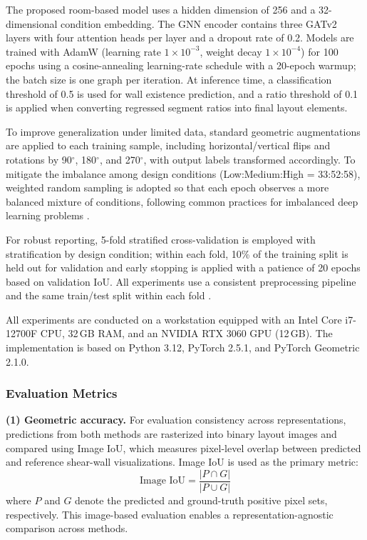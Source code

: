 The proposed room-based model uses a hidden dimension of 256 and a 32-dimensional condition embedding. The GNN encoder contains three GATv2 layers with four attention heads per layer and a dropout rate of 0.2. Models are trained with AdamW (learning rate $1\times 10^{-3}$, weight decay $1\times 10^{-4}$) for 100 epochs using a cosine-annealing learning-rate schedule with a 20-epoch warmup; the batch size is one graph per iteration. At inference time, a classification threshold of 0.5 is used for wall existence prediction, and a ratio threshold of 0.1 is applied when converting regressed segment ratios into final layout elements.

To improve generalization under limited data, standard geometric augmentations are applied to each training sample, including horizontal/vertical flips and rotations by 90$^{\circ}$, 180$^{\circ}$, and 270$^{\circ}$, with output labels transformed accordingly. To mitigate the imbalance among design conditions (Low:Medium:High = 33:52:58), weighted random sampling is adopted so that each epoch observes a more balanced mixture of conditions, following common practices for imbalanced deep learning problems \cite{johnsonSurveyDeepLearning2019}.

For robust reporting, 5-fold stratified cross-validation is employed with stratification by design condition; within each fold, 10\% of the training split is held out for validation and early stopping is applied with a patience of 20 epochs based on validation IoU. All experiments use a consistent preprocessing pipeline and the same train/test split within each fold \cite{Berrar_2019}.

All experiments are conducted on a workstation equipped with an Intel Core i7-12700F CPU, 32\,GB RAM, and an NVIDIA RTX 3060 GPU (12\,GB). The implementation is based on Python 3.12, PyTorch 2.5.1, and PyTorch Geometric 2.1.0.


\subsubsection{Evaluation Metrics}

\textbf{(1) Geometric accuracy.} For evaluation consistency across representations, predictions from both methods are rasterized into binary layout images and compared using Image IoU, which measures pixel-level overlap between predicted and reference shear-wall visualizations. Image IoU is used as the primary metric:
\[
\text{Image IoU}=\frac{|P\cap G|}{|P\cup G|}
\]
where $P$ and $G$ denote the predicted and ground-truth positive pixel sets, respectively. This image-based evaluation enables a representation-agnostic comparison across methods.

